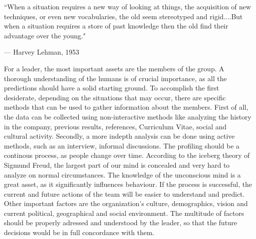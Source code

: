 \documentclass[conference]{IEEEtran}
\begin{document}
\epigraph{``When a situation requires a new way of looking at things, the acquisition of new techniques, or even new vocabularies, the old seem stereotyped and rigid....But when a situation requires a store of past knowledge then the old find their advantage over the young."}{--- \textup{Harvey Lehman}, 1953
}
For a leader, the most important assets are the members of the group. A thorough understanding of the humans is of crucial importance, as all the predictions should have a solid starting ground. To accomplish the first desiderate, depending on the situations that may occur, there are specific methods that can be used to gather information about the members. First of all, the data can be collected using non-interactive methods like analyzing the history in the company, previous results, references, Curriculum Vitae, social and cultural activity.
\newline\indent
Secondly, a more indepth analysis can be done using active methods, such as an interview, informal discussions. The profiling should be a continous process, as people change over time. According to the iceberg theory of Sigmund Freud\cite{IEEEhowto:freud}, the largest part of our mind is concealed and very hard to analyze on normal circumstances. The knowledge of the unconscious mind is a great asset, as it significantly influences behaviour. If the process is successful, the current and future actions of the team will be easier to understand and predict.
Other important factors are the organization's culture, demographics, vision and current political, geographical and social environment. The multitude of factors should be properly adressed and understood by the leader, so that the future decisions would be in full concordance with them.  
\end{document}
